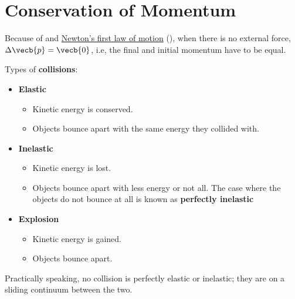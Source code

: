 \section{Conservation of Momentum}

Because of 
and \hyperref[itm:newtons-1st-law]{Newton's first law of motion}
(),
when there is no external force, \(\Delta{\vecb{p}} = \vecb{0}\),
i.e, the final and initial momentum have to be equal.

Types of \textbf{collisions}:
\begin{itemize}
    \item
        \textbf{Elastic}
        \begin{itemize}
            \item Kinetic energy is conserved.
            \item Objects bounce apart with the same energy they collided with.
        \end{itemize}
    \item
        \textbf{Inelastic}
        \begin{itemize}
            \item Kinetic energy is lost.
            \item Objects bounce apart with less energy or not all.
                The case where the objects do not bounce at all
                is known as \textbf{perfectly inelastic}
        \end{itemize}
    \item
        \textbf{Explosion}
        \begin{itemize}
            \item Kinetic energy is gained.
            \item Objects bounce apart.
        \end{itemize}
\end{itemize}

Practically speaking, no collision is perfectly elastic or inelastic;
they are on a sliding continuum between the two.
